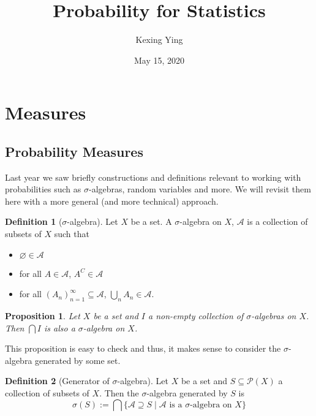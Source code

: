 \documentclass[
]{article}
\title{Probability for Statistics}
\author{Kexing Ying}
\date{May 15, 2020}
\newtheorem{prop}{Proposition}[theorem]
\theoremstyle{definition}
\newtheorem{definition}{Definition}[section]
\begin{document}
\maketitle

{
\hypersetup{linkcolor=}
\setcounter{tocdepth}{2}
\tableofcontents
}
\newpage

\hypertarget{measures}{%
\section{Measures}\label{measures}}

\hypertarget{probability-measures}{%
\subsection{Probability Measures}\label{probability-measures}}

Last year we saw briefly constructions and definitions relevant to
working with probabilities such as \(\sigma\)-algebras, random variables
and more. We will revisit them here with a more general (and more
technical) approach.

\begin{definition}[\(\sigma\)-algebra]
  Let \(X\) be a set. A \(\sigma\)-algebra on \(X\), \(\mathcal{A}\) is a 
  collection of subsets of \(X\) such that 
  \begin{itemize}
    \item \(\varnothing \in \mathcal{A}\) 
    \item for all \(A \in \mathcal{A}\), \(A^C \in \mathcal{A}\)
    \item for all \((A_n)_{n = 1}^\infty \subseteq \mathcal{A}\), 
      \(\bigcup_n A_n \in \mathcal{A}\).
  \end{itemize}
\end{definition}

\begin{prop}
  Let \(X\) be a set and \(I\) a non-empty collection of \(\sigma\)-algebras on 
  \(X\). Then \(\bigcap I\) is also a \(\sigma\)-algebra on \(X\).
\end{prop}

This proposition is easy to check and thus, it makes sense to consider
the \(\sigma\)-algebra generated by some set.

\begin{definition}[Generator of \(\sigma\)-algebra]
  Let \(X\) be a set and \(S \subseteq \mathcal{P}(X)\) a collection of subsets 
  of \(X\). Then the \(\sigma\)-algebra generated by \(S\) is 
  \[
    \sigma(S) := \bigcap \{\mathcal{A} \supseteq S \mid \mathcal{A} 
      \text{ is a \(\sigma\)-algebra on \(X\)} \}
  \]
\end{definition}
\end{document}
